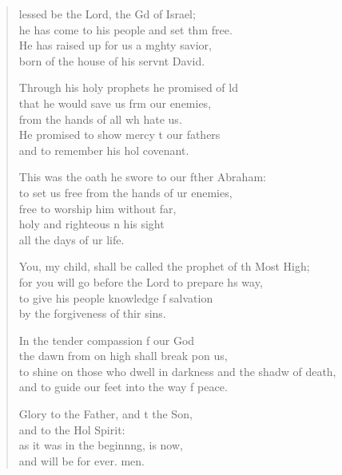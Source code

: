 \begin{verse}
  \begin{patverse}
lessed be the Lord, the Gd of Israel;\Med\\
he has come to his people and set thm free.\\
He has raised up for us a m\pointup{\i}ghty savior,\Med\\
born of the house of his servnt David.

Through his holy prophets he promised of ld\Flex\\
that he would save us frm our enemies,\Med\\
from the hands of all wh hate us.\\
He promised to show mercy t our fathers\Med\\
and to remember his hol covenant.

This was the oath he swore to our fther Abraham:\Med\\
to set us free from the hands of ur enemies,\\
free to worship him without far,\Flex\\
holy and righteous \pointup{\i}n his sight\Med\\
all the days of ur life.

You, my child, shall be called the prophet of th Most High;\Med\\
for you will go before the Lord to prepare h\pointup{\i}s way,\\
to give his people knowledge f salvation\Med\\
by the forgiveness of thir sins.

In the tender compassion f our God\Med\\
the dawn from on high shall break pon us,\\
to shine on those who dwell in darkness and the shadw of death,\Med\\
and to guide our feet into the way f peace.

Glory to the Father, and t the Son,\Med\\
and to the Hol Spirit:\\
as it was in the beginn\pointup{\i}ng, is now,\Med\\
and will be for ever. men.
  \end{patverse}
  \end{verse}
